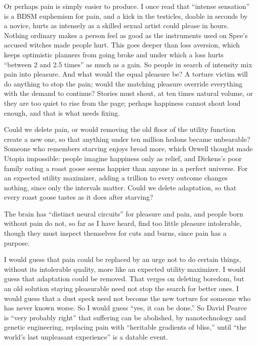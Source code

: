 Or perhaps pain is simply easier to produce. I once read that ``intense sensation'' is a BDSM euphemism for pain, and a kick in the testicles, doable in seconds by a novice, hurts as intensely as a skilled sexual artist could please in hours. Nothing ordinary makes a person feel as good as the instruments used on Spee's accused witches made people hurt.  This goes deeper than loss aversion, which keeps optimistic planners from going broke and under which a loss hurts ``between 2 and 2.5 times'' as much as a gain.  So people in search of intensity mix pain into pleasure. And what would the equal pleasure be? A torture victim will do anything to stop the pain; would the matching pleasure override everything with the demand to continue? Stories must shout, at ten times natural volume, or they are too quiet to rise from the page; perhaps happiness cannot shout loud enough, and that is what needs fixing.

Could we delete pain, or would removing the old floor of the utility function create a new one, so that anything under ten million hedons became unbearable? Someone who remembers starving enjoys bread more, which Orwell thought made Utopia impossible: people imagine happiness only as relief, and Dickens's poor family eating a roast goose seems happier than anyone in a perfect universe. For an expected utility maximizer, adding a trillion to every outcome changes nothing, since only the intervals matter. Could we delete adaptation, so that every roast goose tastes as it does after starving? 

The brain has ``distinct neural circuits'' for pleasure and pain, and people born without pain do not, so far as I have heard, find too little pleasure intolerable, though they must inspect themselves for cuts and burns, since pain has a purpose. 

I would guess that pain could be replaced by an urge not to do certain things, without its intolerable quality, more like an expected utility maximizer. I would guess that adaptation could be removed. That verges on deleting boredom, but an old solution staying pleasurable need not stop the search for better ones. I would guess that a dust speck need not become the new torture for someone who has never known worse. So I would guess ``yes, it can be done.'' So David Pearce is ``very probably right'' that suffering can be abolished, by nanotechnology and genetic engineering, replacing pain with ``heritable gradients of bliss,'' until ``the world's last unpleasant experience'' is a datable event.


